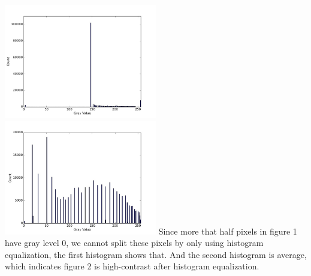 \documentclass{article}
\begin{document}
\includegraphics[width=0.5\textwidth]{../data/histogram_new_Fig1.jpg}
\includegraphics[width=0.5\textwidth]{../data/histogram_new_Fig2.jpg}
Since more that half pixels in figure 1 have gray level 0, we cannot split these pixels by only using histogram equalization, the first histogram shows that. And the second histogram is average, which indicates figure 2 is high-contrast after histogram equalization.
\end{document}
